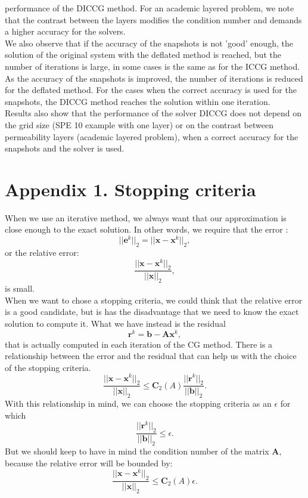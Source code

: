 \documentclass{ecmorXV}
\begin{document}
performance of the DICCG method. 
For an academic layered problem, we note that the contrast between 
the layers modifies the condition number and demands a higher accuracy for the solvers. \\
We also observe that if the accuracy of the snapshots is not 'good' enough, the solution of the 
original system with the deflated method is reached, but the number of iterations is large, in some cases is the same as 
for the ICCG method. As the accuracy of the snapshots is improved, the number of iterations is reduced for
the deflated method.
For the cases when the correct accuracy is used for the snapshots, the DICCG method reaches the solution within 
one iteration. \\
Results also show that the performance of the solver DICCG does not depend on the grid size 
(SPE 10 example with one layer) or on the contrast between permeability layers (academic layered problem), 
when a correct accuracy for the snapshots and the solver is used.

\newpage
\appendix
\section{Appendix 1. Stopping criteria\label{a2}}
When we use an iterative method, we always want that our approximation is close enough 
to the exact solution. In other words, we require that the error \cite[pag. 42]{Saad03}: 
$$||\mathbf{e}^k||_2=||\mathbf{x}-\mathbf{x}^k||_2,$$ or the relative error: 
$$\frac{||\mathbf{x}-\mathbf{x}^k||_2}{||\mathbf{x}||_2},$$is small. \\
When we want to chose a stopping criteria, we could think that the relative error is a
good candidate, but is has the disadvantage that we need to know the exact solution to compute it.
What we have instead is the residual $$\mathbf{r}^k=\mathbf{b}-\mathbf{A}\mathbf{x}^k,$$ 
that is actually computed in each iteration of the CG method. There is a relationship between the 
error and the residual that can help us with the choice of the stopping criteria.
$$\frac{||\mathbf{x}-\mathbf{x}^k||_2}{||\mathbf{x}||_2}\leq \mathbf{C}_2(A)\frac{||\mathbf{r}^k||_2}{||\mathbf{b}||_2}.$$
With this relationship in mind, we can choose the stopping criteria as an $\epsilon$ for which
$$ \frac{||\mathbf{r}^k||_2}{||\mathbf{b}||_2}\leq \epsilon.$$
But we should keep to have in mind the condition number of the matrix $\mathbf{A}$, because the relative error will be bounded by:
$$\frac{||\mathbf{x}-\mathbf{x}^k||_2}{||\mathbf{x}||_2}\leq \mathbf{C}_2(A) \epsilon.$$
\end{document}
